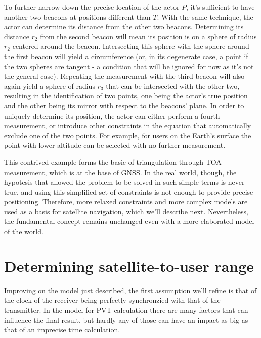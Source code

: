 To further narrow down the precise location of the actor $P$, it's sufficient to
have another two beacons at positions different than $T$. With the same
technique, the actor can determine its distance from the other two beacons.
Determining its distance $r_2$ from the second beacon will mean its position is
on a sphere of radius $r_2$ centered around the beacon. Intersecting this sphere
with the sphere around the first beacon will yield a circumference (or, in its
degenerate case, a point if the two spheres are tangent - a condition that will
be ignored for now as it's not the general case). Repeating the measurement with
the third beacon will also again yield a sphere of radius $r_3$ that can be
intersected with the other two, resulting in the identification of two points,
one being the actor's true position and the other being its mirror with respect
to the beacons' plane. In order to uniquely determine its position, the actor
can either perform a fourth measurement, or introduce other constraints in the
equation that automatically exclude one of the two points. For example, for
users on the Earth's surface the point with lower altitude can be selected with
no further measurement.

\par

This contrived example forms the basic of triangulation through TOA measurement,
which is at the base of GNSS. In the real world, though, the hypotesis that
allowed the problem to be solved in such simple terms is never true, and using
this simplified set of constraints is not enough to provide precise positioning.
Therefore, more relaxed constraints and more complex models are used as a basis
for satellite navigation, which we'll describe next. Nevertheless, the
fundamental concept remains unchanged even with a more elaborated model of the
world.

\section{Determining satellite-to-user range}
Improving on the model just described, the first assumption we'll refine is that
of the clock of the receiver being perfectly synchronzied with that of the
transmitter. In the model for PVT calculation there are many factors that can
influence the final result, but hardly any of those can have an impact as big as
that of an imprecise time calculation.

\par

